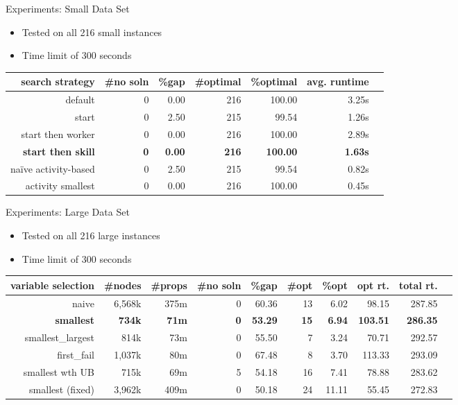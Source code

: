 \documentclass{beamer}
\begin{document}
\begin{frame}{Experiments: Small Data Set}
	\begin{itemize}
		\item Tested on all 216 small instances
		\item Time limit of 300 seconds \pause
	\end{itemize}
	\begin{table}[H]
		\begin{adjustwidth}{-.9in}{-.9in}
		\centering
		\scriptsize
		\begin{tabular}{r|rrrrrr}
			\hline
			search strategy & \#no soln & \%gap & \#optimal & \%optimal & avg. runtime  \\
			\hline
			default & 0 & 0.00 & 216 & 100.00 & 3.25s \\
			start &  0 & 2.50 & 215 & 99.54 & 1.26s \\
			start then worker & 0 & 0.00 & 216 & 100.00 & 2.89s \\
			\bf{start then skill} & \bf{0} & \bf{0.00} & \bf{216} & \bf{100.00} & \bf{1.63s} \\
			na\"{i}ve activity-based & 0 & 2.50 & 215 & 99.54 & 0.82s\\\pause
			activity smallest & 0 & 0.00 & 216 & 100.00 & 0.45s\\\hline
		\end{tabular}
		\end{adjustwidth}
	\end{table}
\end{frame}

\begin{frame}{Experiments: Large Data Set}
	\begin{itemize}
		\item Tested on all 216 large instances
		\item Time limit of 300 seconds \pause
	\end{itemize}
	\begin{table}[H]
		\begin{adjustwidth}{-.9in}{-.9in}
		\centering
		\scriptsize
		\begin{tabular}{r|rrrrrrrrr}
			\hline
			variable selection & \#nodes & \#props & \#no soln & \%gap & \#opt & \%opt & opt rt. & total rt.   \\
			\hline
			naive & 6,568k & 375m & 0 & 60.36 & 13 & 6.02 & 98.15 & 287.85 \\
			\bf{smallest} & \bf{734k} & \bf{71m} & \bf{0} & \bf{53.29} & \bf{15} & \bf{6.94} & \bf{103.51} & \bf{286.35} \\
			smallest\_largest & 814k & 73m & 0 & 55.50 & 7 & 3.24 & 70.71 & 292.57 \\
			first\_fail & 1,037k & 80m & 0 & 67.48 & 8 & 3.70 & 113.33 & 293.09 \\\pause
			smallest wth UB & 715k & 69m & 5 & 54.18 & 16 & 7.41 & 78.88 & 283.62 \\\pause
			smallest (fixed) & 3,962k & 409m & 0 & 50.18 & 24 & 11.11 & 55.45 & 272.83 \\\hline
		\end{tabular}
		\end{adjustwidth}
	\end{table}
\end{frame}
\end{document}
